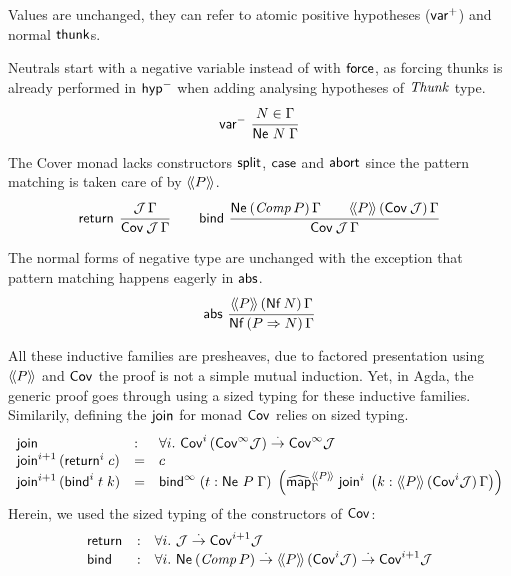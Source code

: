 \documentclass[a4paper,USenglish,cleveref, autoref]{lipics-v2019}
\begin{document}
Values  are unchanged, they can refer to
atomic positive hypotheses ($\pvar$) and normal $\tthunk$s.

Neutrals  start with a negative variable instead
of with $\tforce$, as forcing thunks is already performed in $\nhyp$
when adding analysing hypotheses of $\tThunk$ type.
\[
  \nru{\nvar}{N \in \Gamma}{\Ne N \Gamma}
\]

The Cover monad \fbox{$\Cover \J \Gamma$}
lacks constructors $\tsplit$, $\tcase$ and $\tabort$
since the pattern matching is taken care of by $\Add P$.
\begin{gather*}
  \nru{\treturn}{\J\,\Gamma}{\Cover \J \Gamma}
\qquad
  \nru{\tbind}
      {\NeP {\Comp P} \Gamma \qquad \AddHypP P {\Cov\,\J} \Gamma}
      {\Cover \J \Gamma}
\end{gather*}

The normal forms  of negative type are unchanged
with the exception that pattern matching happens eagerly in $\tabs$.
\[
  \nru{\tabs}
      {\AddHypP P {\tNf\, N} \Gamma}
      {\NfP {P \To N} \Gamma}
\]


All these inductive families are presheaves, due to factored
presentation using $\Add P$ and $\Cov$ the proof is not a simple
mutual induction.  Yet, in Agda, the generic proof goes through using a sized
typing for these inductive families.  Similarily, defining the
$\tjoin$ for monad $\Cov$ relies on sized typing.
\[
\begin{array}{lll}
  \tjoin & : & \forall i.\
    \Cov[i]\,(\Cov[\infty]\J) \todot \Cov[\infty]\J  \\
  \tjoin[i+1]\,(\treturn[i]\;c) & = & c \\
  \tjoin[i+1]\,(\tbind^i\;t\;k)
    & = & \tbind^\infty\;
     (t : \Ne P \Gamma)\;
     \left(\stmap[\Add P]_\Gamma\;\tjoin[i]\;
       \left(k : \AddHypP P {\Cov[i]\J} \Gamma
       \right)
     \right)
\end{array}
\]
Herein, we used the sized typing of the constructors of $\Cov$:
\[
\begin{array}{lll}
  \treturn & : & \forall i.\ \J \todot \Cov[i+1] \J \\
  \tbind  & : & \forall i.\
    \tNe\,(\Comp P) \todot \Add P\,(\Cov[i]\J) \todot \Cov[i+1]\J \\
\end{array}
\]
\end{document}
